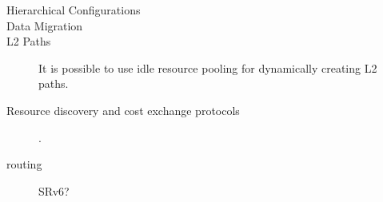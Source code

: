 
\begin{description}

\item[Hierarchical Configurations]

\item[Data Migration]

\item[L2 Paths] It is possible to use idle resource pooling for dynamically
  creating L2 paths.

\item[Resource discovery and cost exchange protocols]
\cite{Albrecht2008}.
  
\item[routing] SRv6?
  
\end{description}
